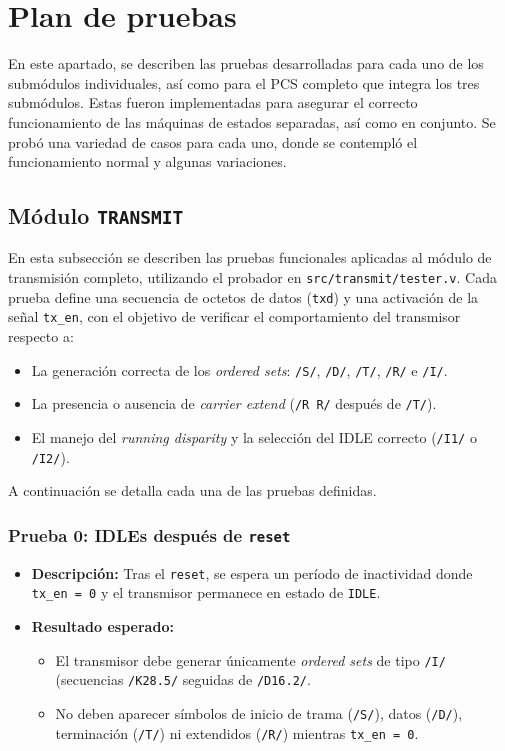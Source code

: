 \section{Plan de pruebas}

En este apartado, se describen las pruebas desarrolladas para cada uno de los submódulos individuales, así como para el PCS completo que integra los tres submódulos.
Estas fueron implementadas para asegurar el correcto funcionamiento de las máquinas de estados separadas, así como en conjunto.
Se probó una variedad de casos para cada uno, donde se contempló el funcionamiento normal y algunas variaciones.

\subsection{Módulo \texttt{TRANSMIT}}

En esta subsección se describen las pruebas funcionales aplicadas al módulo de transmisión completo, utilizando el probador en \texttt{src/transmit/tester.v}.
Cada prueba define una secuencia de octetos de datos (\texttt{txd}) y una activación de la señal \texttt{tx\_en}, con el objetivo de verificar el comportamiento del transmisor respecto a:
\begin{itemize}
  \item La generación correcta de los \textit{ordered sets}: \texttt{/S/}, \texttt{/D/}, \texttt{/T/}, \texttt{/R/} e \texttt{/I/}.
  \item La presencia o ausencia de \textit{carrier extend} (\texttt{/R R/} después de \texttt{/T/}).
  \item El manejo del \textit{running disparity} y la selección del IDLE correcto (\texttt{/I1/} o \texttt{/I2/}).
\end{itemize}

A continuación se detalla cada una de las pruebas definidas.

\subsubsection*{Prueba 0: IDLEs después de \texttt{reset}}

\begin{itemize}
  \item \textbf{Descripción:} Tras el \texttt{reset}, se espera un período de inactividad donde \texttt{tx\_en = 0} y el transmisor permanece en estado de \texttt{IDLE}.
  \item \textbf{Resultado esperado:}
    \begin{itemize}
      \item El transmisor debe generar únicamente \textit{ordered sets} de tipo \texttt{/I/} (secuencias \texttt{/K28.5/} seguidas de \texttt{/D16.2/}.
      \item No deben aparecer símbolos de inicio de trama (\texttt{/S/}), datos (\texttt{/D/}), terminación (\texttt{/T/}) ni extendidos (\texttt{/R/}) mientras \texttt{tx\_en = 0}.
    \end{itemize}
\end{itemize}

